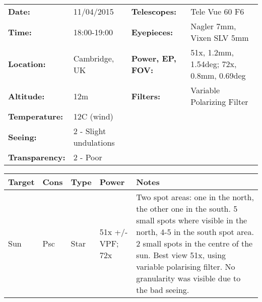 \begin{tabular}{ p{0.9in} p{1.3in} p{1.2in} p{5.2in}}
{\bf Date:} & 11/04/2015 & {\bf Telescopes:} & Tele Vue 60 F6 \\ 
{\bf Time:} & 18:00-19:00 & {\bf Eyepieces:} & Nagler 7mm, Vixen SLV 5mm \\ 
{\bf Location:} & Cambridge, UK & {\bf Power, EP, FOV:} & 51x, 1.2mm, 1.54deg; 72x, 0.8mm, 0.69deg \\ 
{\bf Altitude:} & 12m & {\bf Filters:} & Variable Polarizing Filter \\ 
{\bf Temperature:} & 12C (wind) & & \\ 
{\bf Seeing:} & 2 - Slight undulations & & \\ 
{\bf Transparency:} & 2 - Poor & & \\ 
\end{tabular}
\centering 
\begin{longtable}{ p{0.7in}  p{0.3in}  p{0.6in}  p{0.9in}  p{5.8in} }
\hline 
{\bf Target} & {\bf Cons} & {\bf Type} & {\bf Power} & {\bf Notes} \\ 
\hline 
Sun & Psc & Star & 51x +/- VPF; 72x & Two spot areas: one in the north, the other one in the south. 5 small spots where visible in the north, 4-5 in the south spot area. 2 small spots in the centre of the sun. Best view 51x, using variable polarising filter. No granularity was visible due to the bad seeing. \\ 
\hline 
\end{longtable} 
